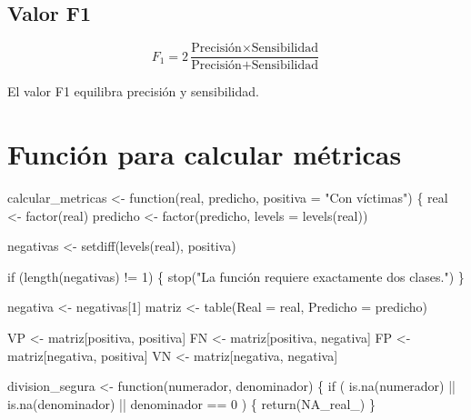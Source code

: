 \documentclass[
  spanish,
  10.5pt,
  letterpaper,
  openany,
  headings=big]{scrbook}
\newenvironment{Shaded}{}{}
\newcommand{\AttributeTok}[1]{\textcolor[rgb]{0.84,0.23,0.29}{#1}}
\newcommand{\ConstantTok}[1]{\textcolor[rgb]{0.00,0.36,0.77}{#1}}
\newcommand{\ControlFlowTok}[1]{\textcolor[rgb]{0.84,0.23,0.29}{#1}}
\newcommand{\DecValTok}[1]{\textcolor[rgb]{0.00,0.36,0.77}{#1}}
\newcommand{\FunctionTok}[1]{\textcolor[rgb]{0.44,0.26,0.76}{#1}}
\newcommand{\NormalTok}[1]{\textcolor[rgb]{0.14,0.16,0.18}{#1}}
\newcommand{\OtherTok}[1]{\textcolor[rgb]{0.44,0.26,0.76}{#1}}
\newcommand{\SpecialCharTok}[1]{\textcolor[rgb]{0.00,0.36,0.77}{#1}}
\newcommand{\StringTok}[1]{\textcolor[rgb]{0.01,0.18,0.38}{#1}}
\begin{document}
\subsection{Valor F1}\label{valor-f1}

\[
F_1=2\frac{\text{Precisión}\times\text{Sensibilidad}}
{\text{Precisión}+\text{Sensibilidad}}
\]

El valor F1 equilibra precisión y sensibilidad.

\section{Función para calcular
métricas}\label{funciuxf3n-para-calcular-muxe9tricas}

\begin{Shaded}
\begin{Highlighting}[]
\NormalTok{calcular\_metricas }\OtherTok{\textless{}{-}} \ControlFlowTok{function}\NormalTok{(real, predicho, }\AttributeTok{positiva =} \StringTok{"Con víctimas"}\NormalTok{) \{}
\NormalTok{  real }\OtherTok{\textless{}{-}} \FunctionTok{factor}\NormalTok{(real)}
\NormalTok{  predicho }\OtherTok{\textless{}{-}} \FunctionTok{factor}\NormalTok{(predicho, }\AttributeTok{levels =} \FunctionTok{levels}\NormalTok{(real))}

\NormalTok{  negativas }\OtherTok{\textless{}{-}} \FunctionTok{setdiff}\NormalTok{(}\FunctionTok{levels}\NormalTok{(real), positiva)}

  \ControlFlowTok{if}\NormalTok{ (}\FunctionTok{length}\NormalTok{(negativas) }\SpecialCharTok{!=} \DecValTok{1}\NormalTok{) \{}
    \FunctionTok{stop}\NormalTok{(}\StringTok{"La función requiere exactamente dos clases."}\NormalTok{)}
\NormalTok{  \}}

\NormalTok{  negativa }\OtherTok{\textless{}{-}}\NormalTok{ negativas[}\DecValTok{1}\NormalTok{]}
\NormalTok{  matriz }\OtherTok{\textless{}{-}} \FunctionTok{table}\NormalTok{(}\AttributeTok{Real =}\NormalTok{ real, }\AttributeTok{Predicho =}\NormalTok{ predicho)}

\NormalTok{  VP }\OtherTok{\textless{}{-}}\NormalTok{ matriz[positiva, positiva]}
\NormalTok{  FN }\OtherTok{\textless{}{-}}\NormalTok{ matriz[positiva, negativa]}
\NormalTok{  FP }\OtherTok{\textless{}{-}}\NormalTok{ matriz[negativa, positiva]}
\NormalTok{  VN }\OtherTok{\textless{}{-}}\NormalTok{ matriz[negativa, negativa]}

\NormalTok{  division\_segura }\OtherTok{\textless{}{-}} \ControlFlowTok{function}\NormalTok{(numerador, denominador) \{}
    \ControlFlowTok{if}\NormalTok{ (}
      \FunctionTok{is.na}\NormalTok{(numerador) }\SpecialCharTok{||}
      \FunctionTok{is.na}\NormalTok{(denominador) }\SpecialCharTok{||}
\NormalTok{      denominador }\SpecialCharTok{==} \DecValTok{0}
\NormalTok{    ) \{}
      \FunctionTok{return}\NormalTok{(}\ConstantTok{NA\_real\_}\NormalTok{)}
\NormalTok{    \}}


\end{Highlighting}
\end{Shaded}
\end{document}
